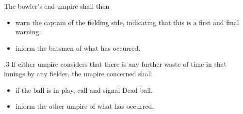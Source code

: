 \documentclass[12pt]{article}
\begin{document}
\vspace{\baselineskip}
\begin{adjustwidth}{0.5in}{0.0in}
{\fontsize{9pt}{10.8pt}\selectfont The bowler’s end umpire shall then\par}\par

\end{adjustwidth}


\vspace{\baselineskip}
\begin{itemize}
	\item {\fontsize{9pt}{10.8pt}\selectfont warn the captain of the fielding side, indicating that this is a first and final warning.\par}\par


\vspace{\baselineskip}
	\item {\fontsize{9pt}{10.8pt}\selectfont inform the batsmen of what has occurred.\par}
\end{itemize}\par


\vspace{\baselineskip}
\begin{adjustwidth}{0.5in}{0.26in}
{\fontsize{9pt}{10.8pt}.3 \tabto{0.49in} If either umpire considers that there is any further waste of time in that innings by any fielder, the umpire concerned shall\par}\par

\end{adjustwidth}


\vspace{\baselineskip}
\begin{itemize}
	\item {\fontsize{9pt}{10.8pt}\selectfont if the ball is in play, call and signal Dead ball.\par}\par


\vspace{\baselineskip}
	\item {\fontsize{9pt}{10.8pt}\selectfont inform the other umpire of what has occurred.\par}
\end{itemize}\par


\vspace{\baselineskip}
\end{document}
